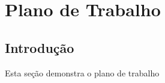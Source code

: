 \pagestyle{empty}
\cleardoublepage
\pagestyle{fancy}

\chapter{Plano de Trabalho}\label{cap7}

\section{Introdução}\label{cap7:intro}

Esta seção demonstra o plano de trabalho







